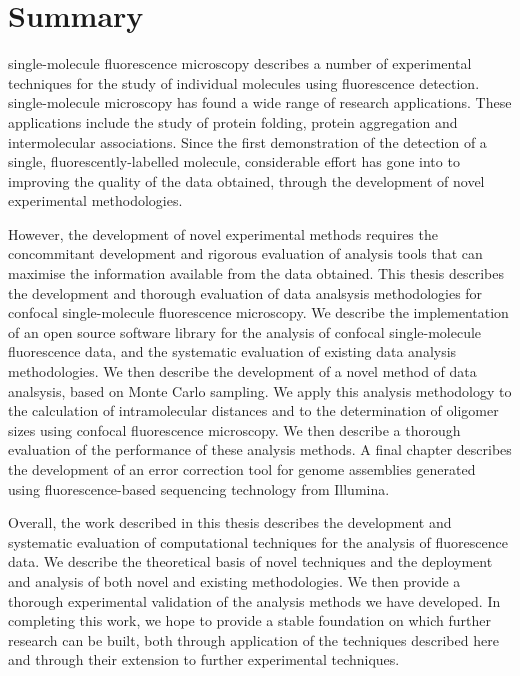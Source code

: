\chapter*{Summary}
single-molecule fluorescence microscopy describes a number of experimental techniques for the study of individual molecules using fluorescence detection. single-molecule microscopy has found a wide range of research applications. These applications include the study of protein folding, protein aggregation and intermolecular associations. Since the first demonstration of the detection of a single, fluorescently-labelled molecule, considerable effort has gone into to improving the quality of the data obtained, through the development of novel experimental methodologies.

However, the development of novel experimental methods requires the concommitant development and rigorous evaluation of analysis tools that can maximise the information available from the data obtained. This thesis describes the development and thorough evaluation of data analsysis methodologies for confocal single-molecule fluorescence microscopy. We describe the implementation of an open source software library for the analysis of confocal single-molecule fluorescence data, and the systematic evaluation of existing data analysis methodologies. We then describe the development of a novel method of data analsysis, based on Monte Carlo sampling. We apply this analysis methodology to the calculation of intramolecular distances and to the determination of oligomer sizes using confocal fluorescence microscopy. We then describe a thorough evaluation of the performance of these analysis methods. A final chapter describes the development of an error correction tool for genome assemblies generated using fluorescence-based sequencing technology from Illumina.

Overall, the work described in this thesis describes the development and systematic evaluation of computational techniques for the analysis of fluorescence data. We describe the theoretical basis of novel techniques and the deployment and analysis of both novel and existing methodologies. We then provide a thorough experimental validation of the analysis methods we have developed. In completing this work, we hope to provide a stable foundation on which further research can be built, both through application of the techniques described here and through their extension to further experimental techniques.

